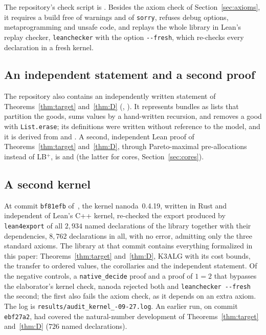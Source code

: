 \documentclass[runningheads,11pt]{llncs}
\newcommand{\LBp}{\texorpdfstring{\mbox{LB$^{+}$}}{LB+}}
\begin{document}
The repository's check script is . Besides the axiom check of Section~\ref{sec:axioms}, it requires a build free of warnings and of \texttt{sorry}, refuses debug options, metaprogramming and unsafe code, and replays the whole library in Lean's replay checker, \texttt{leanchecker} with the option \texttt{-{}-fresh}, which re-checks every declaration in a fresh kernel.

\subsection{An independent statement and a second proof}\label{sec:audit}

The repository also contains an independently written statement of Theorems~\ref{thm:target} and~\ref{thm:D} (, ). It represents bundles as lists that partition the goods, sums values by a hand-written recursion, and removes a good with \texttt{List.erase}; its definitions were written without reference to the model, and it is derived from  and . A second, independent Lean proof of Theorems~\ref{thm:target} and~\ref{thm:D}, through Pareto-maximal pre-allocations instead of \LBp{}, is  and  (the latter for cores, Section~\ref{sec:cores}).

\subsection{A second kernel}\label{sec:kernel}

At commit \texttt{bf81efb} of~\cite{Repo}, the kernel nanoda~0.4.19, written in Rust and independent of Lean's C++ kernel, re-checked the export produced by \texttt{lean4export} of all $2{,}934$ named declarations of the library together with their dependencies, $8{,}762$ declarations in all, with no error, admitting only the three standard axioms. The library at that commit contains everything formalized in this paper: Theorems~\ref{thm:target} and~\ref{thm:D}, K3ALG with its cost bounds, the transfer to ordered values, the corollaries and the independent statement. Of the negative controls, a \texttt{native\_decide} proof and a proof of $1=2$ that bypasses the elaborator's kernel check, nanoda rejected both and \texttt{leanchecker~-{}-fresh} the second; the first also fails the axiom check, as it depends on an extra axiom. The log is \texttt{results/\allowbreak audit\_kernel\_-09-27.log}. An earlier run, on commit \texttt{ebf27a2}, had covered the natural-number development of Theorems~\ref{thm:target} and~\ref{thm:D} ($726$ named declarations).
\end{document}
